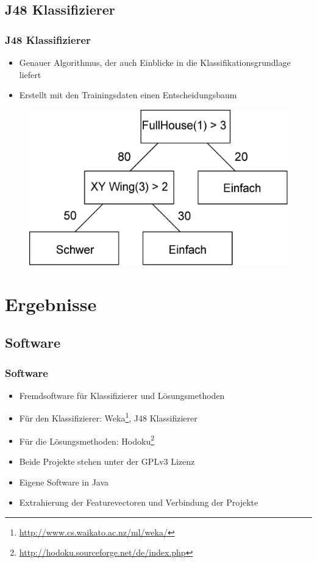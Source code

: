 \documentclass[accentcolor=tud6b,colorbacktitle,inverttitle,landscape,german,presentation,t]{tudbeamer}
\begin{document}
	\subsection{J48 Klassifizierer}
		\begin{frame}
		\frametitle{J48 Klassifizierer}
		\begin{itemize}
		\item Genauer Algorithmus, der auch Einblicke in die Klassifikationsgrundlage liefert
		\item Erstellt mit den Trainingsdaten einen Entscheidungsbaum
		\end{itemize}
		\begin{figure}[Hh]
    		\includegraphics[width=\textwidth - 150pt,height=\textheight-10pt,keepaspectratio]{./img/entscheidungsbaum.eps}
		\end{figure}
		\end{frame}

\section{Ergebnisse}
	\subsection{Software}
		\begin{frame}
		\frametitle{Software}
		\begin{itemize}
		\item Fremdsoftware für Klassifizierer und Lösungsmethoden
		\item Für den Klassifizierer: Weka\footnote{\url{http://www.cs.waikato.ac.nz/ml/weka/}}, J48 Klassifizierer
		\item Für die Lösungsmethoden: Hodoku\footnote{\url{http://hodoku.sourceforge.net/de/index.php}}
		\item Beide Projekte stehen unter der GPLv3 Lizenz
		\item Eigene Software in Java
		\item Extrahierung der Featurevectoren und Verbindung der Projekte
		\end{itemize}
		\end{frame}
\end{document}
